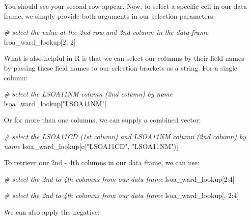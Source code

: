 \documentclass[
]{book}
\newenvironment{Shaded}{\begin{snugshade}}{\end{snugshade}}
\newcommand{\CommentTok}[1]{\textcolor[rgb]{0.56,0.35,0.01}{\textit{#1}}}
\newcommand{\DecValTok}[1]{\textcolor[rgb]{0.00,0.00,0.81}{#1}}
\newcommand{\FunctionTok}[1]{\textcolor[rgb]{0.00,0.00,0.00}{#1}}
\newcommand{\NormalTok}[1]{#1}
\newcommand{\SpecialCharTok}[1]{\textcolor[rgb]{0.00,0.00,0.00}{#1}}
\newcommand{\StringTok}[1]{\textcolor[rgb]{0.31,0.60,0.02}{#1}}
\begin{document}
You should see your second row appear. Now, to select a specific cell in our data frame, we simply provide both arguments in our selection parameters:

\begin{Shaded}
\begin{Highlighting}[]
\CommentTok{\# select the value at the 2nd row and 2nd column in the data frame}
\NormalTok{lsoa\_ward\_lookup[}\DecValTok{2}\NormalTok{, }\DecValTok{2}\NormalTok{]}
\end{Highlighting}
\end{Shaded}

What is also helpful in R is that we can select our columns by their field names by passing these field names to our selection brackets as a string. For a single column:

\begin{Shaded}
\begin{Highlighting}[]
\CommentTok{\# select the LSOA11NM column (2nd column) by name}
\NormalTok{lsoa\_ward\_lookup[}\StringTok{"LSOA11NM"}\NormalTok{]}
\end{Highlighting}
\end{Shaded}

Or for more than one columns, we can supply a combined vector:

\begin{Shaded}
\begin{Highlighting}[]
\CommentTok{\# select the LSOA11CD (1st column) and LSOA11NM column (2nd column) by name}
\NormalTok{lsoa\_ward\_lookup[}\FunctionTok{c}\NormalTok{(}\StringTok{"LSOA11CD"}\NormalTok{, }\StringTok{"LSOA11NM"}\NormalTok{)]}
\end{Highlighting}
\end{Shaded}

To retrieve our 2nd - 4th columns in our data frame, we can use:

\begin{Shaded}
\begin{Highlighting}[]
\CommentTok{\# select the 2nd to 4th columns from our data frame}
\NormalTok{lsoa\_ward\_lookup[}\DecValTok{2}\SpecialCharTok{:}\DecValTok{4}\NormalTok{]}

\CommentTok{\# select the 2nd to 4th columns from our data frame}
\NormalTok{lsoa\_ward\_lookup[, }\DecValTok{2}\SpecialCharTok{:}\DecValTok{4}\NormalTok{]}
\end{Highlighting}
\end{Shaded}

We can also apply the negative:
\end{document}
